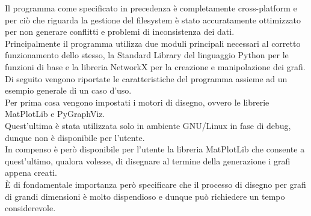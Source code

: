 Il programma come specificato in precedenza è completamente cross-platform e per ciò che riguarda la gestione del filesystem è stato accuratamente ottimizzato per non generare conflitti e problemi di inconsistenza dei dati.\\

Principalmente il programma utilizza due moduli principali necessari al corretto funzionamento dello stesso, la Standard Library del linguaggio Python per le funzioni di base e la libreria NetworkX per la creazione e manipolazione dei grafi.\\

Di seguito vengono riportate le caratteristiche del programma assieme ad un esempio generale di un caso d'uso.\\

Per prima cosa vengono impostati i motori di disegno, ovvero le librerie MatPlotLib e PyGraphViz.\\
Quest'ultima è stata utilizzata solo in ambiente GNU/Linux in fase di debug, dunque non è disponibile per l'utente.\\

In compenso è però disponibile per l'utente la libreria MatPlotLib che consente a quest'ultimo, qualora volesse, di disegnare al termine della generazione i grafi appena creati.\\
È di fondamentale importanza però specificare che il processo di disegno per grafi di grandi dimensioni è molto dispendioso e dunque può richiedere un tempo considerevole.\\



%
%
%
%
